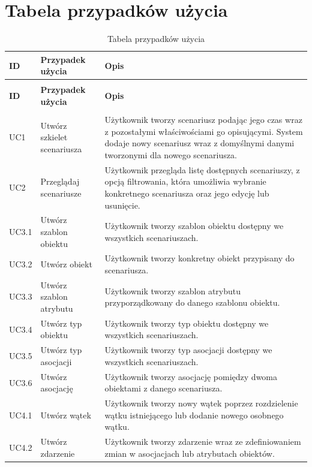 \section{Tabela przypadków użycia}
\small{
\begin{longtable}{|p{1cm}|p{4.5cm}|p{8cm}|}
    \hline
    \textbf{ID} & \textbf{Przypadek użycia} & \textbf{Opis} \\
    \hline
    \endfirsthead
    \caption[]{Tabela przypadków użycia -- ciąg dalszy} \\
    \hline
    \textbf{ID} & \textbf{Przypadek użycia} & \textbf{Opis} \\
    \hline
    \endhead
    \hline
    \endfoot
    \hline
    \caption{Tabela przypadków użycia} \label{tab:use_case_table} \\
    \endlastfoot
    UC1 & Utwórz szkielet scenariusza & Użytkownik tworzy scenariusz podając jego czas wraz z pozostałymi właściwościami go opisującymi. System dodaje nowy scenariusz wraz z domyślnymi danymi tworzonymi dla nowego scenariusza. \\
    \hline
    UC2 & Przeglądaj scenariusze & Użytkownik przegląda listę dostępnych scenariuszy, z opcją filtrowania, która umożliwia wybranie konkretnego scenariusza oraz jego edycję lub usunięcie. \\
    \hline
    UC3.1 & Utwórz szablon obiektu & Użytkownik tworzy szablon obiektu dostępny we wszystkich scenariuszach. \\
    \hline
    UC3.2 & Utwórz obiekt & Użytkownik tworzy konkretny obiekt przypisany do scenariusza. \\
    \hline
    UC3.3 & Utwórz szablon atrybutu & Użytkownik tworzy szablon atrybutu przyporządkowany do danego szablonu obiektu. \\
    \hline
    UC3.4 & Utwórz typ obiektu & Użytkownik tworzy typ obiektu dostępny we wszystkich scenariuszach. \\
    \hline
    UC3.5 & Utwórz typ asocjacji & Użytkownik tworzy typ asocjacji dostępny we wszystkich scenariuszach. \\
    \hline
    UC3.6 & Utwórz asocjację & Użytkownik tworzy asocjację pomiędzy dwoma obiektami z danego scenariusza. \\
    \hline
    UC4.1 & Utwórz wątek & Użytkownik tworzy nowy wątek poprzez rozdzielenie wątku istniejącego lub dodanie nowego osobnego wątku. \\
    \hline
    UC4.2 & Utwórz zdarzenie & Użytkownik tworzy zdarzenie wraz ze zdefiniowaniem zmian w asocjacjach lub atrybutach obiektów. \\

\end{longtable}}
